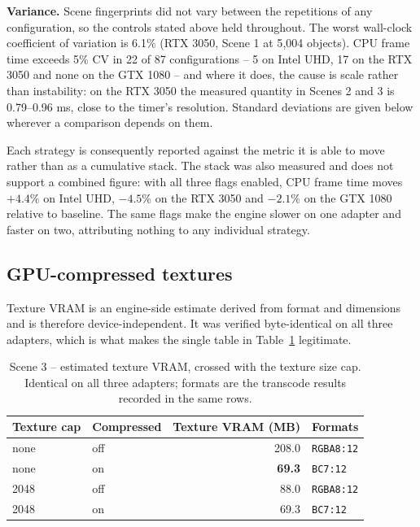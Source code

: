 \textbf{Variance.} Scene fingerprints did not vary between the repetitions of any
configuration, so the controls stated above held throughout. The worst wall-clock
coefficient of variation is 6.1\% (RTX 3050, Scene 1 at 5{,}004 objects). CPU frame time
exceeds 5\% CV in 22 of 87 configurations -- 5 on Intel UHD, 17 on the RTX 3050 and none
on the GTX 1080 -- and where it does, the cause is scale rather than instability: on the
RTX 3050 the measured quantity in Scenes 2 and 3 is 0.79--0.96 ms, close to the timer's
resolution. Standard deviations are given below wherever a comparison depends on them.

Each strategy is consequently reported against the metric it is able to move rather than as a cumulative stack. The stack was also measured and does not support a combined figure: with all three flags enabled, CPU frame time moves $+4.4$\% on Intel UHD, $-4.5$\% on the RTX 3050 and $-2.1$\% on the GTX 1080 relative to baseline. The same flags make the engine slower on one adapter and faster on two, attributing nothing to any individual strategy.

\subsection{GPU-compressed textures}
\label{sec:res-ktx2}

Texture VRAM is an engine-side estimate derived from format and dimensions and is therefore device-independent. It was verified byte-identical on all three adapters, which is what makes the single table in Table~\ref{tab:ktx2-vram} legitimate.

\begin{table}[H]
\centering\small\setlength{\tabcolsep}{5pt}
\caption{Scene 3 -- estimated texture VRAM, crossed with the texture size cap. Identical on all three adapters; formats are the transcode results recorded in the same rows.}
\label{tab:ktx2-vram}
\begin{tabular}{llrl}
\toprule
Texture cap & Compressed & Texture VRAM (MB) & Formats \\
\midrule
none    & off & 208.0 & \texttt{RGBA8:12} \\
none    & on  & \textbf{69.3} & \texttt{BC7:12} \\
2048    & off & 88.0  & \texttt{RGBA8:12} \\
2048    & on  & 69.3  & \texttt{BC7:12} \\
\bottomrule
\end{tabular}
\end{table}

